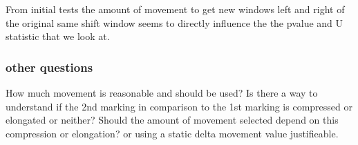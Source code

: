 \documentclass[12pt]{article}
\begin{document}
From initial tests the amount of movement to get new windows left and
right of the original same shift window seems to directly influence the
the pvalue and U statistic that we look at.

\subsubsection{other questions}\label{other-questions}

How much movement is reasonable and should be used? Is there a way to
understand if the 2nd marking in comparison to the 1st marking is
compressed or elongated or neither? Should the amount of movement
selected depend on this compression or elongation? or using a static
delta movement value justifieable.



\end{document}
